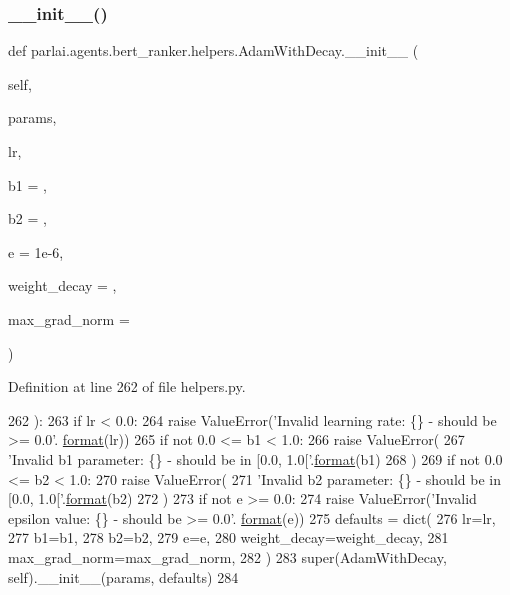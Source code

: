 \subsubsection{\texorpdfstring{\+\_\+\+\_\+init\+\_\+\+\_\+()}{\_\_init\_\_()}}
{\footnotesize\ttfamily def parlai.\+agents.\+bert\+\_\+ranker.\+helpers.\+Adam\+With\+Decay.\+\_\+\+\_\+init\+\_\+\+\_\+ (\begin{DoxyParamCaption}\item[{}]{self,  }\item[{}]{params,  }\item[{}]{lr,  }\item[{}]{b1 = {},  }\item[{}]{b2 = {},  }\item[{}]{e = {\ttfamily 1e-\/6},  }\item[{}]{weight\+\_\+decay = {},  }\item[{}]{max\+\_\+grad\+\_\+norm = {} }\end{DoxyParamCaption})}



Definition at line 262 of file helpers.\+py.


\begin{DoxyCode}
262     ):
263         \textcolor{keywordflow}{if} lr < 0.0:
264             \textcolor{keywordflow}{raise} ValueError(\textcolor{stringliteral}{'Invalid learning rate: \{\} - should be >= 0.0'}.
      \hyperlink{namespaceparlai_1_1chat__service_1_1services_1_1messenger_1_1shared__utils_a32e2e2022b824fbaf80c747160b52a76}{format}(lr))
265         \textcolor{keywordflow}{if} \textcolor{keywordflow}{not} 0.0 <= b1 < 1.0:
266             \textcolor{keywordflow}{raise} ValueError(
267                 \textcolor{stringliteral}{'Invalid b1 parameter: \{\} - should be in [0.0, 1.0['}.\hyperlink{namespaceparlai_1_1chat__service_1_1services_1_1messenger_1_1shared__utils_a32e2e2022b824fbaf80c747160b52a76}{format}(b1)
268             )
269         \textcolor{keywordflow}{if} \textcolor{keywordflow}{not} 0.0 <= b2 < 1.0:
270             \textcolor{keywordflow}{raise} ValueError(
271                 \textcolor{stringliteral}{'Invalid b2 parameter: \{\} - should be in [0.0, 1.0['}.\hyperlink{namespaceparlai_1_1chat__service_1_1services_1_1messenger_1_1shared__utils_a32e2e2022b824fbaf80c747160b52a76}{format}(b2)
272             )
273         \textcolor{keywordflow}{if} \textcolor{keywordflow}{not} e >= 0.0:
274             \textcolor{keywordflow}{raise} ValueError(\textcolor{stringliteral}{'Invalid epsilon value: \{\} - should be >= 0.0'}.
      \hyperlink{namespaceparlai_1_1chat__service_1_1services_1_1messenger_1_1shared__utils_a32e2e2022b824fbaf80c747160b52a76}{format}(e))
275         defaults = dict(
276             lr=lr,
277             b1=b1,
278             b2=b2,
279             e=e,
280             weight\_decay=weight\_decay,
281             max\_grad\_norm=max\_grad\_norm,
282         )
283         super(AdamWithDecay, self).\_\_init\_\_(params, defaults)
284 
\end{DoxyCode}


